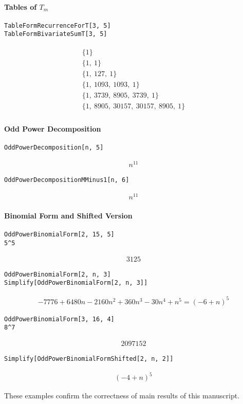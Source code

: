 \paragraph{Tables of \texorpdfstring{$T_m$}{Tm}}
\begin{verbatim}
TableFormRecurrenceForT[3, 5]
TableFormBivariateSumT[3, 5]
\end{verbatim}
\begin{align*}
    \begin{array}{l}
        \{1\} \\
        \{1,\ 1\} \\
        \{1,\ 127,\ 1\} \\
        \{1,\ 1093,\ 1093,\ 1\} \\
        \{1,\ 3739,\ 8905,\ 3739,\ 1\} \\
        \{1,\ 8905,\ 30157,\ 30157,\ 8905,\ 1\}
    \end{array}
\end{align*}

\paragraph{Odd Power Decomposition}
\begin{verbatim}
OddPowerDecomposition[n, 5]
\end{verbatim}
\begin{align*}
    n^{11}
\end{align*}
\begin{verbatim}
OddPowerDecompositionMMinus1[n, 6]
\end{verbatim}
\begin{align*}
    n^{11}
\end{align*}

\paragraph{Binomial Form and Shifted Version}
\begin{verbatim}
OddPowerBinomialForm[2, 15, 5]
5^5
\end{verbatim}
\begin{align*}
    3125
\end{align*}
\begin{verbatim}
OddPowerBinomialForm[2, n, 3]
Simplify[OddPowerBinomialForm[2, n, 3]]
\end{verbatim}
\begin{align*}
    -7776 + 6480n - 2160n^2 + 360n^3 - 30n^4 + n^5 = (-6 + n)^5
\end{align*}
\begin{verbatim}
OddPowerBinomialForm[3, 16, 4]
8^7
\end{verbatim}
\begin{align*}
    2097152
\end{align*}
\begin{verbatim}
Simplify[OddPowerBinomialFormShifted[2, n, 2]]
\end{verbatim}
\begin{align*}
(-4 + n)
    ^5
\end{align*}

These examples confirm the correctness of main results of this manuscript.

